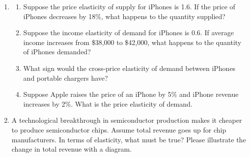\documentclass{article}
\begin{document}
\begin{enumerate}
\begin{enumerate}
	\item Calculate the price elasticity of demand between a price of \$5 and \$4 per gallon.
	
	\item Is demand for gas elastic or inelastic?
	
	\item If the price of gas changed in September, but we measured the change in quantity demanded in March of the next year, would demand for gas be more or less elastic? Why?
	
	\end{enumerate}
	
\item 

	\begin{enumerate}
	
	\item Suppose the price elasticity of supply for iPhones is 1.6. If the price of iPhones decreases by 18\%, what happens to the quantity supplied?
	
	\item Suppose the income elasticity of demand for iPhones is 0.6. If average income increases from \$38,000 to \$42,000, what happens to the quantity of iPhones demanded?
	
	\item What sign would the cross-price elasticity of demand between iPhones and portable chargers have?
	
	\item Suppose Apple raises the price of an iPhone by 5\% and iPhone revenue increases by 2\%. What is the price elasticity of demand. 
	
	\end{enumerate}
	
\item A technological breakthrough in semiconductor production makes it cheaper to produce semiconductor chips. Assume total revenue goes up for chip manufacturers. In terms of elasticity, what must be true? Please illustrate the change in total revenue with a diagram.

\end{enumerate}
\end{document}
